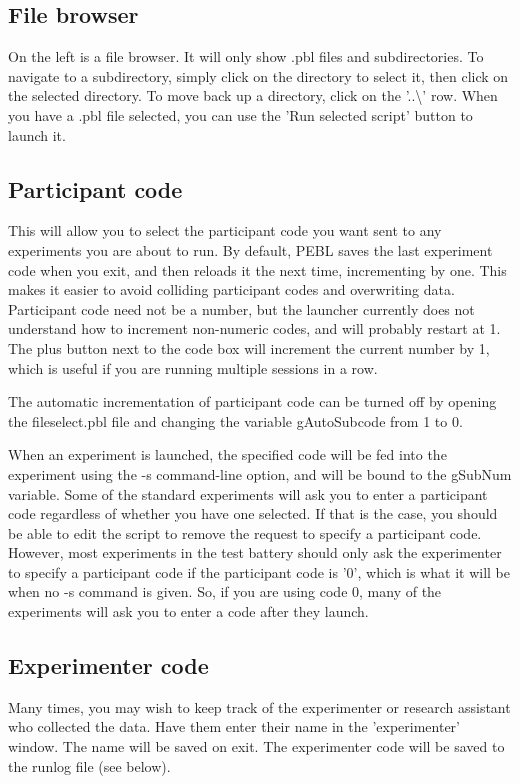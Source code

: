 \subsection{File browser}
On the left is a file browser.  It will only show .pbl files and
subdirectories.  To navigate to a subdirectory, simply click on the
directory to select it, then click on the selected directory.  To move
back up a directory, click on the '..\textbackslash' row.  When you have a .pbl file
selected, you can use the 'Run selected script' button to launch it.


\subsection{Participant code}
This will allow you to select the participant code you want sent to
any experiments you are about to run.  By default, PEBL saves the last
experiment code when you exit, and then reloads it the next time,
incrementing by one.  This makes it easier to avoid colliding
participant codes and overwriting data.  Participant code need not be
a number, but the launcher currently does not understand how to
increment non-numeric codes, and will probably restart at 1.  The plus button next to the 
code box will increment the current number by 1, which is useful if you are running multiple sessions in a row.

The automatic incrementation of participant code can be turned off by
opening the fileselect.pbl file and changing the variable gAutoSubcode
from 1 to 0.

When an experiment is launched, the specified code will be fed into
the experiment using the -s command-line option, and will be bound to
the gSubNum variable.  Some of the standard experiments will ask you
to enter a participant code regardless of whether you have one selected.
If that is the case, you should be able to edit the script to remove
the request to specify a participant code. However, most experiments in
the test battery should only ask the experimenter to specify a participant
code if the participant code is '0', which is what it will be when no -s
command is given.  So, if you are using code 0, many of the
experiments will ask you to enter a code after they launch.


\subsection{Experimenter code}
Many times, you may wish to keep track of the experimenter or research
assistant who collected the data.  Have them enter their name in the
'experimenter' window.  The name will be saved on exit.  The
experimenter code will be saved to the runlog file (see below). 

